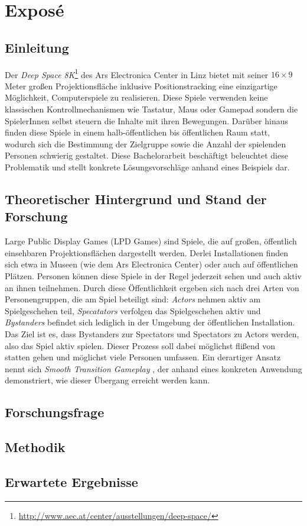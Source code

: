 \chapter{Exposé}

\section{Einleitung}

Der \emph{Deep Space 8K}\footnote{\url{http://www.aec.at/center/ausstellungen/deep-space/}} des Ars Electronica Center in Linz bietet mit seiner $16 \times 9$ Meter großen Projektionsfläche inklusive Positionstracking eine einzigartige Möglichkeit, Computerspiele zu realisieren. Diese Spiele verwenden keine klassischen Kontrollmechanismen wie Tastatur, Maus oder Gamepad sondern die SpielerInnen selbst steuern die Inhalte mit ihren Bewegungen. Darüber hinaus finden diese Spiele in einem halb-öffentlichen bis öffentlichen Raum statt, wodurch sich die Bestimmung der Zielgruppe sowie die Anzahl der spielenden Personen schwierig gestaltet. Diese Bachelorarbeit beschäftigt beleuchtet diese Problematik und stellt konkrete Lösungsvorschläge anhand eines Beispiels dar.

\section{Theoretischer Hintergrund und Stand der Forschung}

Large Public Display Games (LPD Games) sind Spiele, die auf großen, öffentlich einsehbaren Projektionsflächen dargestellt werden. Derlei Installationen finden sich etwa in Museen (wie dem Ars Electronica Center) oder auch auf öffentlichen Plätzen. Personen können diese Spiele in der Regel jederzeit sehen und auch aktiv an ihnen teilnehmen. Durch diese Öffentlichkeit ergeben sich nach \cite{Finke2008} drei Arten von Personengruppen, die am Spiel beteiligt sind: \emph{Actors} nehmen aktiv am Spielgeschehen teil, \emph{Specatators} verfolgen das Spielgeschehen aktiv und \emph{Bystanders} befindet sich lediglich in der Umgebung der öffentlichen Installation. Das Ziel ist es, dass Bystanders zur Spectators und Spectators zu Actors werden, also das Spiel aktiv spielen. Dieser Prozess soll dabei möglichst flißend von statten gehen und möglichst viele Personen umfassen. Ein derartiger Ansatz nennt sich \emph{Smooth Transition Gameplay} \cite{Hochleitner2013}, der anhand eines konkreten Anwendung demonstriert, wie dieser Übergang erreicht werden kann.

\section{Forschungsfrage}


\section{Methodik}

\section{Erwartete Ergebnisse}